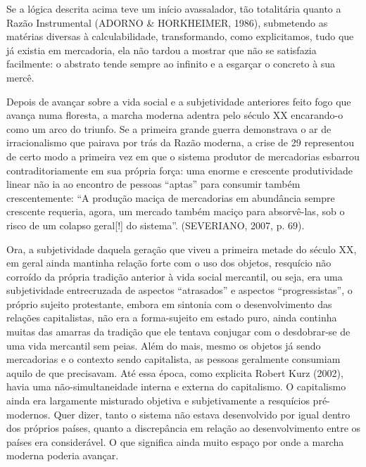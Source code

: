 Se a lógica descrita acima teve um início avassalador, tão totalitária
quanto a Razão Instrumental (ADORNO \& HORKHEIMER, 1986), submetendo as
matérias diversas à calculabilidade, transformando, como explicitamos,
tudo que já existia em mercadoria, ela não tardou a mostrar que não se
satisfazia facilmente: o abstrato tende sempre ao infinito e a esgarçar
o concreto à sua mercê.

Depois de avançar sobre a vida social e a subjetividade anteriores feito
fogo que avança numa floresta, a marcha moderna adentra pelo século XX
encarando-o como um arco do triunfo. Se a primeira grande guerra
demonstrava o ar de irracionalismo que pairava por trás da Razão
moderna, a crise de 29 representou de certo modo a primeira vez em que o
sistema produtor de mercadorias esbarrou contraditoriamente em sua
própria força: uma enorme e crescente produtividade linear não ia ao
encontro de pessoas ``aptas'' para consumir também crescentemente: ``A
produção maciça de mercadorias em abundância sempre crescente requeria,
agora, um mercado também maciço para absorvê-las, sob o risco de um
colapso geral{[}!{]} do sistema''. (SEVERIANO, 2007, p. 69).

Ora, a subjetividade daquela geração que viveu a primeira metade do
século XX, em geral ainda mantinha relação forte com o uso dos objetos,
resquício não corroído da própria tradição anterior à vida social
mercantil, ou seja, era uma subjetividade entrecruzada de aspectos
``atrasados'' e aspectos ``progressistas'', o próprio sujeito
protestante, embora em sintonia com o desenvolvimento das relações
capitalistas, não era a forma-sujeito em estado puro, ainda continha
muitas das amarras da tradição que ele tentava conjugar com o
desdobrar-se de uma vida mercantil sem peias. Além do mais, mesmo os
objetos já sendo mercadorias e o contexto sendo capitalista, as pessoas
geralmente consumiam aquilo de que precisavam. Até essa época, como
explicita Robert Kurz (2002), havia uma não-simultaneidade interna e
externa do capitalismo. O capitalismo ainda era largamente misturado
objetiva e subjetivamente a resquícios pré-modernos. Quer dizer, tanto o
sistema não estava desenvolvido por igual dentro dos próprios países,
quanto a discrepância em relação ao desenvolvimento entre os países era
considerável. O que significa ainda muito espaço por onde a marcha
moderna poderia avançar.

